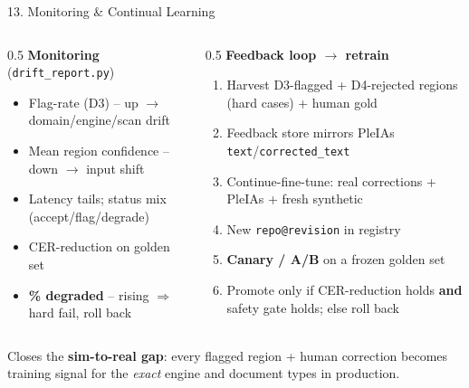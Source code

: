 \documentclass[10pt,aspectratio=169]{beamer}
\begin{document}
\begin{frame}{13. Monitoring \& Continual Learning}
\begin{columns}[T]
\begin{column}{0.5\textwidth}
\textbf{Monitoring} (\texttt{drift\_report.py})
\begin{itemize}\small
  \item Flag-rate (D3) -- up $\rightarrow$ domain/engine/scan drift
  \item Mean region confidence -- down $\rightarrow$ input shift
  \item Latency tails; status mix (accept/flag/degrade)
  \item CER-reduction on golden set
  \item \textbf{\% degraded} -- rising $\Rightarrow$ hard fail, roll back
\end{itemize}
\end{column}
\begin{column}{0.5\textwidth}
\textbf{Feedback loop $\rightarrow$ retrain}
\begin{enumerate}\small
  \item Harvest D3-flagged + D4-rejected regions (hard cases) + human gold
  \item Feedback store mirrors PleIAs \texttt{text}/\texttt{corrected\_text}
  \item Continue-fine-tune: real corrections + PleIAs + fresh synthetic
  \item New \texttt{repo@revision} in registry
  \item \textbf{Canary / A/B} on a frozen golden set
  \item Promote only if CER-reduction holds \textbf{and} safety gate holds; else roll back
\end{enumerate}
\end{column}
\end{columns}

\vspace{0.15cm}
\centering
\scriptsize Closes the \textbf{sim-to-real gap}: every flagged region + human correction becomes training signal for the \emph{exact} engine and document types in production.
\end{frame}
\end{document}
